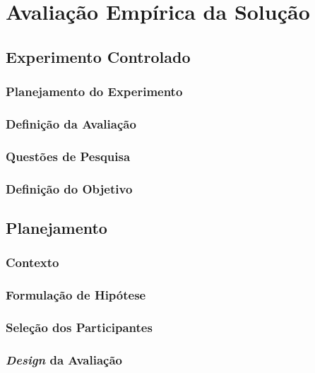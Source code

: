 \chapter{Avaliação Empírica da Solução}\label{validacaoProposta}

\section{Experimento Controlado} \label{sec:reqDSL}
\cite{Wohlin:2012}

\subsection{Planejamento do Experimento}

\subsection{Definição da Avaliação}
\subsection{Questões de Pesquisa}
\subsection{Definição do Objetivo}

\section{Planejamento}
\subsection{Contexto}
\subsection{Formulação de Hipótese}
\subsection{Seleção dos Participantes}
\subsection{\textit{Design} da Avaliação}
